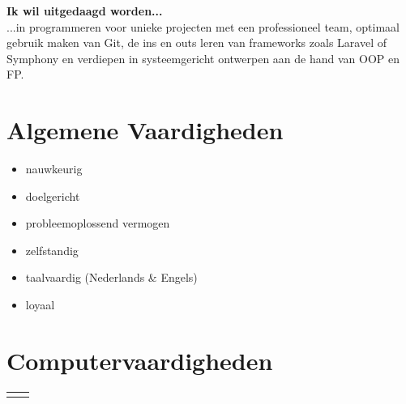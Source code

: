 \documentclass[
	11pt, %
]{FreemanCV}
\begin{document}
\begin{paracol}{2}
	\textbf{Ik wil uitgedaagd worden...}\\
	...in programmeren voor unieke projecten met een professioneel team, optimaal gebruik maken 
	van Git, de ins en outs leren van frameworks zoals Laravel of Symphony en verdiepen in 
	systeemgericht ontwerpen aan de hand van OOP en FP.


	\section{Algemene Vaardigheden}
	\begin{itemize}
		\item nauwkeurig
		\item doelgericht
		\item probleemoplossend vermogen
		\item zelfstandig
        \item taalvaardig \small (Nederlands \& Engels) \normalsize
		\item loyaal
	\end{itemize}

	\section{Computervaardigheden}

	\begin{supertabular}{r l} %



\end{supertabular}
\end{paracol}
\end{document}
